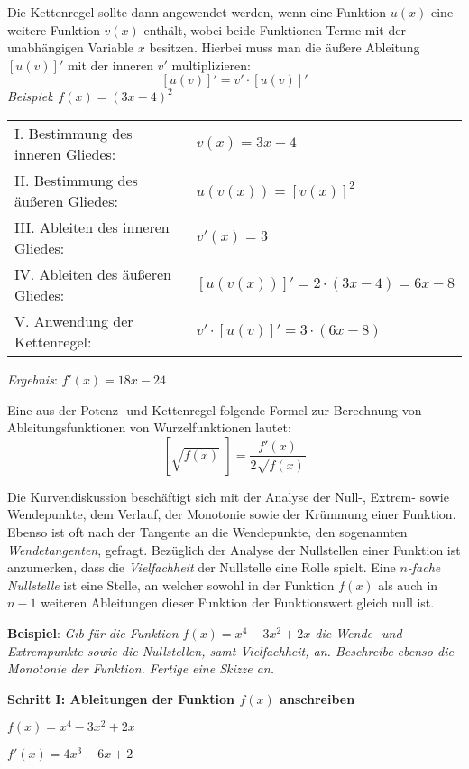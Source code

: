 \pagebreak


Die Kettenregel sollte dann angewendet werden, wenn eine Funktion $u(x)$ eine weitere Funktion $v(x)$ enth\"{a}lt, wobei beide Funktionen Terme mit der unabh\"{a}ngigen Variable $x$ besitzen. Hierbei muss man die \"{a}u\ss{}ere Ableitung $[u(v)]'$ mit der inneren $v'$ multiplizieren: $$[u(v)]' = v' \cdot [u(v)]'$$
\emph{Beispiel}: $f(x) = (3x - 4)^2$

\begin{tabular}{l l}
	I. Bestimmung des inneren Gliedes: & $v(x) = 3x - 4$
	\extrapar \\
	II. Bestimmung des \"{a}u\ss{}eren Gliedes: & $u(v(x)) = [v(x)]^2$
	\extrapar \\
	III. Ableiten des inneren Gliedes: & $v'(x) = 3$
	\extrapar \\
	IV. Ableiten des \"{a}u\ss{}eren Gliedes: & $[u(v(x))]' = 2 \cdot (3x - 4) = 6x - 8$
	\extrapar \\
	V. Anwendung der Kettenregel: & $v' \cdot [u(v)]' = 3 \cdot (6x - 8)$
\end{tabular}

\emph{Ergebnis}: $f'(x) = 18x - 24$

Eine aus der Potenz- und Kettenregel folgende Formel zur Berechnung von Ableitungsfunktionen von Wurzelfunktionen lautet: $$\left[\sqrt{f(x)}\,\,\right] = \frac{f'(x)}{2\sqrt{f(x)}}$$

Die Kurvendiskussion besch\"{a}ftigt sich mit der Analyse der Null-, Extrem- sowie Wendepunkte, dem Verlauf, der Monotonie sowie der Kr\"{u}mmung einer Funktion. Ebenso ist oft nach der Tangente an die Wendepunkte, den sogenannten \emph{Wendetangenten}, gefragt. Bez\"{u}glich der Analyse der Nullstellen einer Funktion ist anzumerken, dass die \emph{Vielfachheit} der Nullstelle eine Rolle spielt. Eine \emph{$n$-fache Nullstelle} ist eine Stelle, an welcher sowohl in der Funktion $f(x)$ als auch in $n-1$ weiteren Ableitungen dieser Funktion der Funktionswert gleich null ist. 

\textbf{Beispiel}: \emph{Gib f\"{u}r die Funktion $f(x) = x^4 - 3x^2 + 2x$ die Wende- und Extrempunkte sowie die Nullstellen, samt Vielfachheit, an. Beschreibe ebenso die Monotonie der Funktion. Fertige eine Skizze an.}

\textbf{Schritt I: Ableitungen der Funktion $f(x)$ anschreiben}

$f(x) = x^4 - 3x^2 + 2x$

$f'(x) = 4x^3 - 6x + 2$

